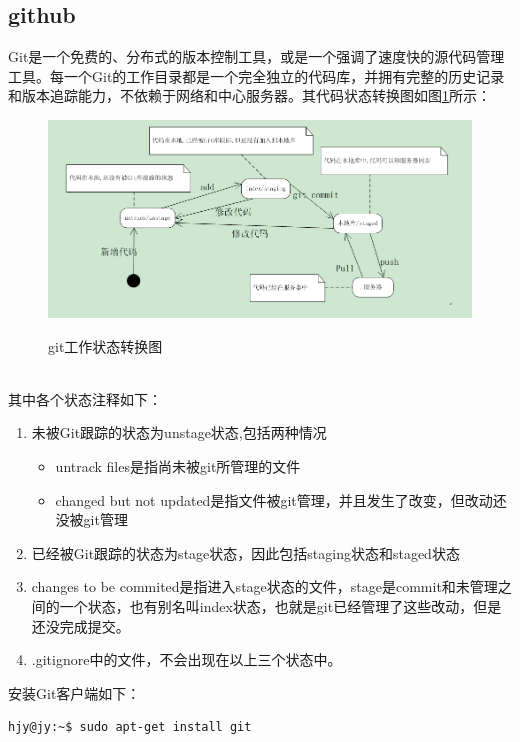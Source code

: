 \subsection{github}
Git是一个免费的、分布式的版本控制工具，或是一个强调了速度快的源代码管理工具。每一个Git的工作目录都是一个完全独立的代码库，并拥有完整的历史记录和版本追踪能力，不依赖于网络和中心服务器。其代码状态转换图如图\ref{fig:ubuntu_git_flow}所示：
\begin{figure}[!htbp]
	\centering
	\caption{git工作状态转换图}  
		\includegraphics[scale=0.40]{figs/ubuntu_git_flow.png}
    	\label{fig:ubuntu_git_flow}
\end{figure}\\
其中各个状态注释如下：
\begin{enumerate}
\item 未被Git跟踪的状态为unstage状态,包括两种情况
\begin{itemize}
\item untrack files是指尚未被git所管理的文件
\item changed but not updated是指文件被git管理，并且发生了改变，但改动还没被git管理
\end{itemize}
\item 已经被Git跟踪的状态为stage状态，因此包括staging状态和staged状态
\item changes to be commited是指进入stage状态的文件，stage是commit和未管理之间的一个状态，也有别名叫index状态，也就是git已经管理了这些改动，但是还没完成提交。
\item .gitignore中的文件，不会出现在以上三个状态中。
\end{enumerate}

安装Git客户端如下：
\begin{lstlisting}[style=BASH]
hjy@jy:~$ sudo apt-get install git
\end{lstlisting}

